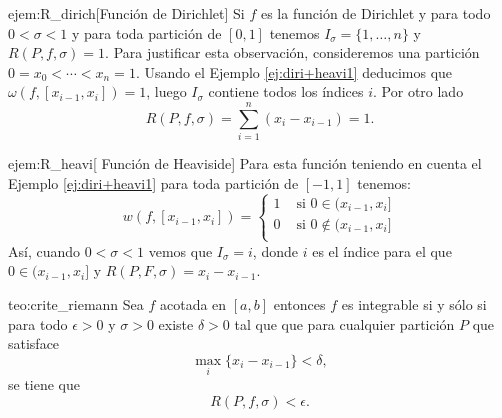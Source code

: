 \begin{ejemplo}{ejem:R_dirich}[Función de Dirichlet] Si $f$ es  la función de Dirichlet y para todo $0<\sigma<1$ y para toda partición de $[0,1]$ tenemos $I_{\sigma}=\{1,\ldots,n\}$ y $R(P,f,\sigma)=1$. Para justificar esta observación, consideremos una partición $0=x_0<\cdots<x_n=1$. Usando el Ejemplo \ref{ej:diri+heavi1} deducimos  que $\omega(f,[x_{i-1},x_i])=1 $, luego  $I_{\sigma}$ contiene todos los índices $i$. Por otro lado
\[
 R(P,f,\sigma)=\sum_{i=1}^n(x_i-x_{i-1})=1. 
\]

 
\end{ejemplo}

\begin{ejemplo}{ejem:R_heavi}[ Función de Heaviside]  Para esta función teniendo en cuenta el  Ejemplo \ref{ej:diri+heavi1}  para toda partición de $[-1,1]$ tenemos:
 \[
  w(f,[x_{i-1},x_i])=\begin{cases}
          1 & \text{ si } 0\in (x_{i-1},x_i]\\
          0 & \text{ si } 0\notin (x_{i-1},x_i]\\
         \end{cases}
 \]
Así, cuando $0<\sigma<1$ vemos que $I_{\sigma}=i$, donde $i$ es el índice para el que $0\in (x_{i-1},x_i]$ y $R(P,F,\sigma)=x_i-x_{i-1}$.
 
\end{ejemplo}

\begin{teorema}{teo:crite_riemann} Sea $f$ acotada en $[a,b]$ entonces $f$ es integrable si y sólo si  para todo $\epsilon>0$ y $\sigma>0$ existe $\delta>0$ tal que que para cualquier partición $P$ que satisface
\[\max_i\{x_i-x_{i-1}\}<\delta,\]
se tiene que
\[R(P,f,\sigma)<\epsilon.\]
\end{teorema}

